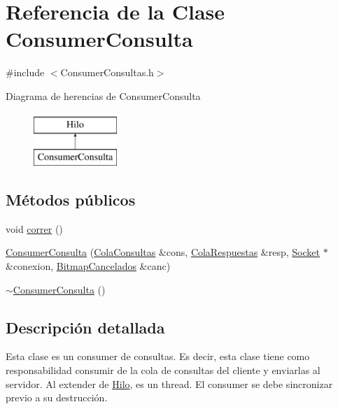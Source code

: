 \hypertarget{classConsumerConsulta}{\section{\-Referencia de la \-Clase \-Consumer\-Consulta}
\label{classConsumerConsulta}
}


{\ttfamily \#include $<$\-Consumer\-Consultas.\-h$>$}

\-Diagrama de herencias de \-Consumer\-Consulta\begin{figure}[H]
\begin{center}
\leavevmode
\includegraphics[height=2.000000cm]{classConsumerConsulta}
\end{center}
\end{figure}
\subsection*{\-Métodos públicos}
\begin{DoxyCompactItemize}
\item 
void \hyperlink{classConsumerConsulta_a2ad005877299d61a9f3ba037c1019a02}{correr} ()
\item 
\hyperlink{classConsumerConsulta_ad36f766c49532db3b01b306c70a0e622}{\-Consumer\-Consulta} (\hyperlink{classBLQueue}{\-Cola\-Consultas} \&cons, \hyperlink{classBLQueue}{\-Cola\-Respuestas} \&resp, \hyperlink{classSocket}{\-Socket} $\ast$\&conexion, \hyperlink{classBLMap}{\-Bitmap\-Cancelados} \&canc)
\item 
\hyperlink{classConsumerConsulta_acbed30d06ed4bbeeb4dc5335f042c8c0}{$\sim$\-Consumer\-Consulta} ()
\end{DoxyCompactItemize}


\subsection{\-Descripción detallada}
\-Esta clase es un consumer de consultas. \-Es decir, esta clase tiene como responsabilidad consumir de la cola de consultas del cliente y enviarlas al servidor. \-Al extender de \hyperlink{classHilo}{\-Hilo}, es un thread. \-El consumer se debe sincronizar previo a su destrucción. 

